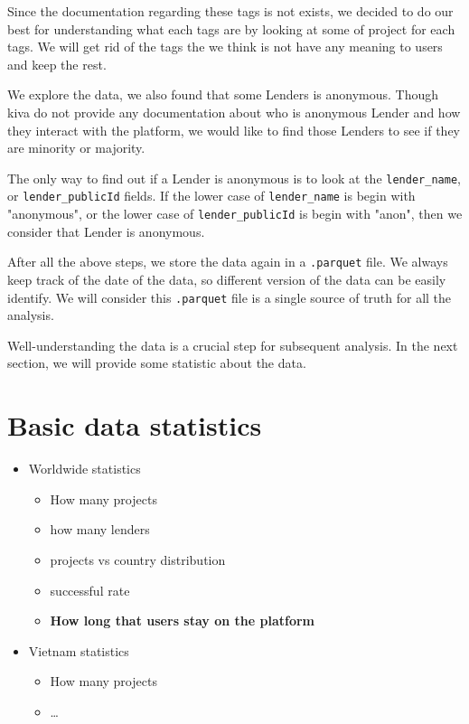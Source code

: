 Since the documentation regarding these tags is not exists,
we decided to do our best for understanding what each tags are by looking at some of project for each tags.
We will get rid of the tags the we think is not have any meaning to users and keep the rest.



We explore the data, we also found that some Lenders is anonymous.
Though kiva do not provide any documentation about who is anonymous Lender and how they interact with the platform,
we would like to find those Lenders to see if they are minority or majority.


The only way to find out if a Lender is anonymous is to look at the \lstinline|lender_name|,
or \lstinline|lender_publicId| fields.
If the lower case of \lstinline|lender_name| is begin with "anonymous",
or the lower case of \lstinline|lender_publicId| is begin with "anon",
then we consider that Lender is anonymous.


After all the above steps, we store the data again in a \lstinline|.parquet| file.
We always keep track of the date of the data, so different version of the data can be easily identify.
We will consider this \lstinline|.parquet| file is a single source of truth for all the analysis.

Well-understanding the data is a crucial step for subsequent analysis.
In the next section, we will provide some statistic about the data.

\section{Basic data statistics}

\begin{itemize}
	\item Worldwide statistics
	      \begin{itemize}
		      \item How many projects
		      \item how many lenders
		      \item projects vs country distribution
		      \item successful rate
		      \item \textbf{How long that users stay on the platform}
	      \end{itemize}
	\item Vietnam statistics
	      \begin{itemize}
		      \item How many projects
		      \item \dots
	      \end{itemize}
\end{itemize}

